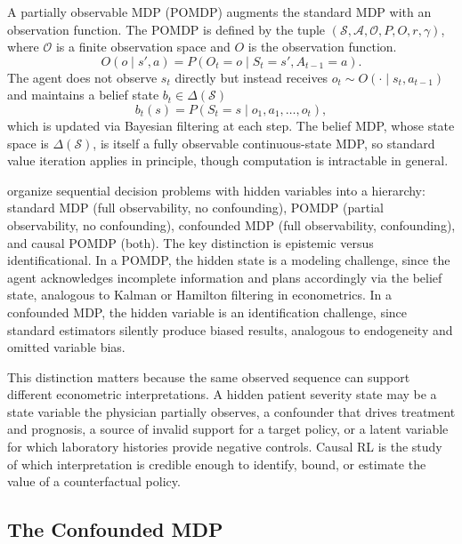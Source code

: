 A partially observable MDP (POMDP) augments the standard MDP with an observation function. The POMDP is defined by the tuple $(\mathcal{S}, \mathcal{A}, \mathcal{O}, P, O, r, \gamma)$, where $\mathcal{O}$ is a finite observation space and $O$ is the observation function.
\begin{equation}
O(o \mid s', a) = P(O_t = o \mid S_t = s', A_{t-1} = a).
\label{eq:pomdp_obs}
\end{equation}
The agent does not observe $s_t$ directly but instead receives $o_t \sim O(\cdot \mid s_t, a_{t-1})$ and maintains a belief state $b_t \in \Delta(\mathcal{S})$
\begin{equation}
b_t(s) = P(S_t = s \mid o_1, a_1, \ldots, o_t),
\label{eq:belief_state}
\end{equation}
which is updated via Bayesian filtering at each step. The belief MDP, whose state space is $\Delta(\mathcal{S})$, is itself a fully observable continuous-state MDP, so standard value iteration applies in principle, though computation is intractable in general.

\citet{dacostacunha2025unifying} organize sequential decision problems with hidden variables into a hierarchy: standard MDP (full observability, no confounding), POMDP (partial observability, no confounding), confounded MDP (full observability, confounding), and causal POMDP (both). The key distinction is epistemic versus identificational. In a POMDP, the hidden state is a modeling challenge, since the agent acknowledges incomplete information and plans accordingly via the belief state, analogous to Kalman or Hamilton filtering in econometrics. In a confounded MDP, the hidden variable is an identification challenge, since standard estimators silently produce biased results, analogous to endogeneity and omitted variable bias.

This distinction matters because the same observed sequence can support different econometric interpretations. A hidden patient severity state may be a state variable the physician partially observes, a confounder that drives treatment and prognosis, a source of invalid support for a target policy, or a latent variable for which laboratory histories provide negative controls. Causal RL is the study of which interpretation is credible enough to identify, bound, or estimate the value of a counterfactual policy.

\subsection{The Confounded MDP}
\label{subsec:confounded_mdp}

